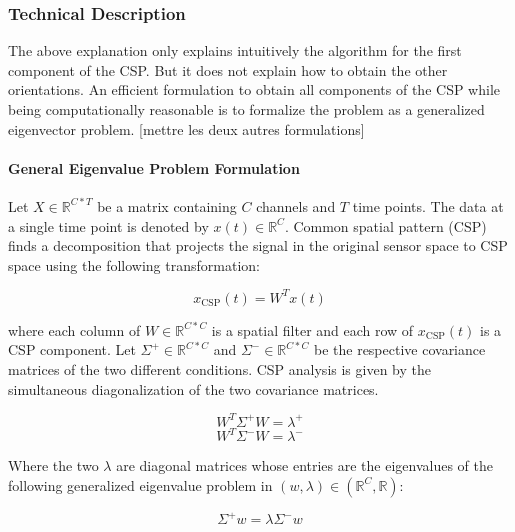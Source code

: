 \subsubsection{Technical Description}

The above explanation only explains intuitively the algorithm for the first component of the CSP. But it does not explain how to obtain the other orientations. An efficient formulation to obtain all components of the CSP while being computationally reasonable is to formalize the problem as a generalized eigenvector problem.
[mettre les deux autres formulations]

\paragraph{General Eigenvalue Problem Formulation}

Let $X \in \mathbb{R}^{C * T}$ be a matrix containing $C$ channels and $T$ time points. The data at a single time point is denoted by $x(t) \in  \mathbb{R}^{C}$. Common spatial pattern (CSP) finds a decomposition that projects the signal in the original sensor space to CSP space using the following transformation:

\begin{equation}
    x_{\text{CSP}}(t) = W^{T}x(t)
\end{equation}

where each column of $W \in \mathbb{R}^{C*C}$ is a spatial filter and each row of $x_{\text{CSP}}(t)$ is a CSP component. Let $\Sigma^{+} \in \mathbb{R}^{C * C}$ and $\Sigma^{-} \in \mathbb{R}^{C * C}$ be the respective covariance matrices of the two different conditions. CSP analysis is given by the simultaneous diagonalization of the two covariance matrices.


\begin{equation}
    W^{T} \Sigma^{+} W = \lambda^{+}
    \label{eq:lambda_plus}
\end{equation}
\begin{equation}
    W^{T} \Sigma^{-} W = \lambda^{-}
    \label{eq:lambda_minus}
\end{equation}

Where the two $\lambda$ are diagonal matrices whose entries are the eigenvalues of the following generalized eigenvalue problem in $(w, \lambda) \in (\mathbb{R}^{C}, \mathbb{R})$:

\begin{equation}
    \Sigma^{+} w = \lambda \Sigma^{-} w
    \label{eq:general_eigenvalue}
\end{equation}

